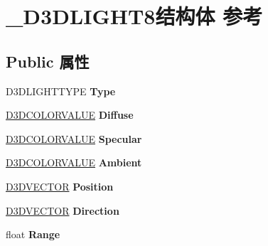 \hypertarget{struct___d3_d_l_i_g_h_t8}{}\section{\+\_\+\+D3\+D\+L\+I\+G\+H\+T8结构体 参考}
\label{struct___d3_d_l_i_g_h_t8}
\subsection*{Public 属性}
\begin{DoxyCompactItemize}
\item 
\mbox{\label{struct___d3_d_l_i_g_h_t8_a5cc0dd969d8a66e6eb5183533eecb6a2}} 
D3\+D\+L\+I\+G\+H\+T\+T\+Y\+PE {\bfseries Type}
\item 
\mbox{\label{struct___d3_d_l_i_g_h_t8_a210c7928083e34f9ac0993a0b22a5d6e}} 
\hyperlink{struct___d3_d_c_o_l_o_r_v_a_l_u_e}{D3\+D\+C\+O\+L\+O\+R\+V\+A\+L\+UE} {\bfseries Diffuse}
\item 
\mbox{\label{struct___d3_d_l_i_g_h_t8_a4c210d73e49c4df584836dd9cad3e4de}} 
\hyperlink{struct___d3_d_c_o_l_o_r_v_a_l_u_e}{D3\+D\+C\+O\+L\+O\+R\+V\+A\+L\+UE} {\bfseries Specular}
\item 
\mbox{\label{struct___d3_d_l_i_g_h_t8_ac084b9a4ad2eacc1519d5693ec134a80}} 
\hyperlink{struct___d3_d_c_o_l_o_r_v_a_l_u_e}{D3\+D\+C\+O\+L\+O\+R\+V\+A\+L\+UE} {\bfseries Ambient}
\item 
\mbox{\label{struct___d3_d_l_i_g_h_t8_aeb48b2837106e6ae835dfc4f301e1712}} 
\hyperlink{struct___d3_d_v_e_c_t_o_r}{D3\+D\+V\+E\+C\+T\+OR} {\bfseries Position}
\item 
\mbox{\label{struct___d3_d_l_i_g_h_t8_a19268522160c502fec6068041043724c}} 
\hyperlink{struct___d3_d_v_e_c_t_o_r}{D3\+D\+V\+E\+C\+T\+OR} {\bfseries Direction}
\item 
\mbox{\label{struct___d3_d_l_i_g_h_t8_a4cb12e171e2fb2af34f08df6e1ff4924}} 
float {\bfseries Range}
\item 
\mbox{\label{struct___d3_d_l_i_g_h_t8_a81b92b81949798f16042ec6d37520db1}} 

\end{DoxyCompactItemize}
